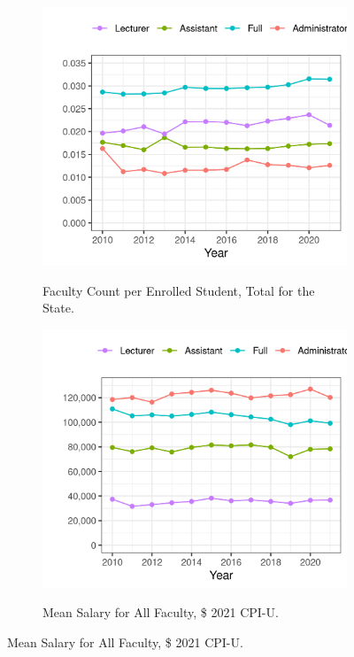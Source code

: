 \documentclass[notitlepage,12pt]{article}
\begin{document}
\begin{figure}[h!]
    \centering
    \singlespacing
    \caption{Faculty Profile at Illinois Public Universities 2011-2021.}
    \begin{subfigure}[b]{0.495\textwidth}
        \centering
        \caption{Faculty Count per Enrolled Student, Total for the State.}
        \includegraphics[width=\textwidth]{figures/faculty-count-illinois.png}
        \label{fig:faculty-count-illinois}
    \end{subfigure}
    \begin{subfigure}[b]{0.495\textwidth}
        \centering
        \caption{Mean Salary for All Faculty, \$ 2021 CPI-U.}
        \includegraphics[width=\textwidth]{figures/faculty-salary-illinois.png}
        \label{fig:faculty-salary-illinois}
    \end{subfigure}
    \label{fig:faculty-illinois}
\end{figure}
\end{document}
